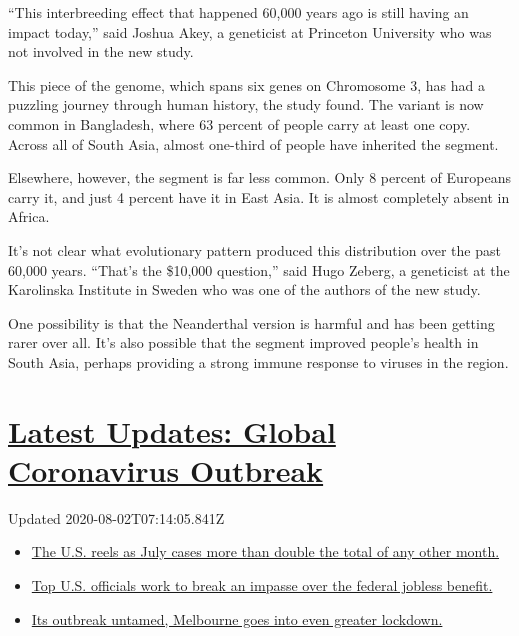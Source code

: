 ``This interbreeding effect that happened 60,000 years ago is still
having an impact today,'' said Joshua Akey, a geneticist at Princeton
University who was not involved in the new study.

This piece of the genome, which spans six genes on Chromosome 3, has had
a puzzling journey through human history, the study found. The variant
is now common in Bangladesh, where 63 percent of people carry at least
one copy. Across all of South Asia, almost one-third of people have
inherited the segment.

Elsewhere, however, the segment is far less common. Only 8 percent of
Europeans carry it, and just 4 percent have it in East Asia. It is
almost completely absent in Africa.

It's not clear what evolutionary pattern produced this distribution over
the past 60,000 years. ``That's the \$10,000 question,'' said Hugo
Zeberg, a geneticist at the Karolinska Institute in Sweden who was one
of the authors of the new study.

One possibility is that the Neanderthal version is harmful and has been
getting rarer over all. It's also possible that the segment improved
people's health in South Asia, perhaps providing a strong immune
response to viruses in the region.

\hypertarget{latest-updates-global-coronavirus-outbreak}{%
\section{\texorpdfstring{\href{https://www.nytimes.com/2020/08/01/world/coronavirus-covid-19.html?action=click\&pgtype=Article\&state=default\&region=MAIN_CONTENT_1\&context=storylines_live_updates}{Latest
Updates: Global Coronavirus
Outbreak}}{Latest Updates: Global Coronavirus Outbreak}}\label{latest-updates-global-coronavirus-outbreak}}

Updated 2020-08-02T07:14:05.841Z

\begin{itemize}
\tightlist
\item
  \href{https://www.nytimes.com/2020/08/01/world/coronavirus-covid-19.html?action=click\&pgtype=Article\&state=default\&region=MAIN_CONTENT_1\&context=storylines_live_updates\#link-34047410}{The
  U.S. reels as July cases more than double the total of any other
  month.}
\item
  \href{https://www.nytimes.com/2020/08/01/world/coronavirus-covid-19.html?action=click\&pgtype=Article\&state=default\&region=MAIN_CONTENT_1\&context=storylines_live_updates\#link-780ec966}{Top
  U.S. officials work to break an impasse over the federal jobless
  benefit.}
\item
  \href{https://www.nytimes.com/2020/08/01/world/coronavirus-covid-19.html?action=click\&pgtype=Article\&state=default\&region=MAIN_CONTENT_1\&context=storylines_live_updates\#link-2bc8948}{Its
  outbreak untamed, Melbourne goes into even greater lockdown.}
\end{itemize}

